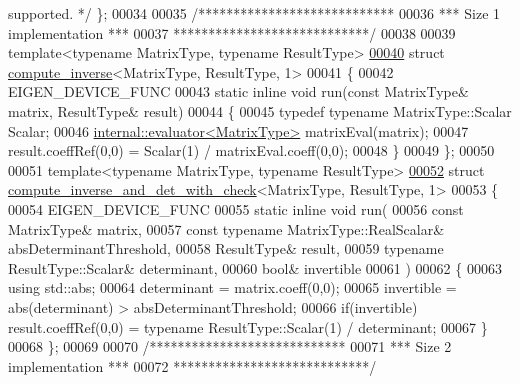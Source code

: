 \begin{DoxyCode}
{       supported. */} \};
00034 
00035 \textcolor{comment}{/****************************}
00036 \textcolor{comment}{*** Size 1 implementation ***}
00037 \textcolor{comment}{****************************/}
00038 
00039 \textcolor{keyword}{template}<\textcolor{keyword}{typename} MatrixType, \textcolor{keyword}{typename} ResultType>
\hyperlink{struct_eigen_1_1internal_1_1compute__inverse_3_01_matrix_type_00_01_result_type_00_011_01_4}{00040} \textcolor{keyword}{struct }\hyperlink{struct_eigen_1_1internal_1_1compute__inverse}{compute\_inverse}<MatrixType, ResultType, 1>
00041 \{
00042   EIGEN\_DEVICE\_FUNC
00043   \textcolor{keyword}{static} \textcolor{keyword}{inline} \textcolor{keywordtype}{void} run(\textcolor{keyword}{const} MatrixType& matrix, ResultType& result)
00044   \{
00045     \textcolor{keyword}{typedef} \textcolor{keyword}{typename} MatrixType::Scalar Scalar;
00046     \hyperlink{struct_eigen_1_1internal_1_1evaluator}{internal::evaluator<MatrixType>} matrixEval(matrix);
00047     result.coeffRef(0,0) = Scalar(1) / matrixEval.coeff(0,0);
00048   \}
00049 \};
00050 
00051 \textcolor{keyword}{template}<\textcolor{keyword}{typename} MatrixType, \textcolor{keyword}{typename} ResultType>
\hyperlink{struct_eigen_1_1internal_1_1compute__inverse__and__det__with__check_3_01_matrix_type_00_01_result_type_00_011_01_4}{00052} \textcolor{keyword}{struct }\hyperlink{struct_eigen_1_1internal_1_1compute__inverse__and__det__with__check}{compute\_inverse\_and\_det\_with\_check}<MatrixType, ResultType, 1>
00053 \{
00054   EIGEN\_DEVICE\_FUNC
00055   \textcolor{keyword}{static} \textcolor{keyword}{inline} \textcolor{keywordtype}{void} run(
00056     \textcolor{keyword}{const} MatrixType& matrix,
00057     \textcolor{keyword}{const} \textcolor{keyword}{typename} MatrixType::RealScalar& absDeterminantThreshold,
00058     ResultType& result,
00059     \textcolor{keyword}{typename} ResultType::Scalar& determinant,
00060     \textcolor{keywordtype}{bool}& invertible
00061   )
00062   \{
00063     \textcolor{keyword}{using} std::abs;
00064     determinant = matrix.coeff(0,0);
00065     invertible = abs(determinant) > absDeterminantThreshold;
00066     \textcolor{keywordflow}{if}(invertible) result.coeffRef(0,0) = \textcolor{keyword}{typename} ResultType::Scalar(1) / determinant;
00067   \}
00068 \};
00069 
00070 \textcolor{comment}{/****************************}
00071 \textcolor{comment}{*** Size 2 implementation ***}
00072 \textcolor{comment}{****************************/}

\end{DoxyCode}
